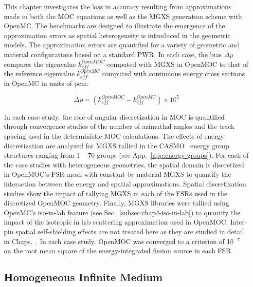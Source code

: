 This chapter investigates the loss in accuracy resulting from approximations made in both the \ac{MOC} equations as well as the \ac{MGXS} generation scheme with OpenMC. The benchmarks are designed to illustrate the emergence of the approximation errors as spatial heterogeneity is introduced in the geometric models. The approximation errors are quantified for a variety of geometric and material configurations based on a standard \ac{PWR}. In each case, the bias $\Delta\rho$ compares the eigenvalue $k_{eff}^{OpenMOC}$ computed with \ac{MGXS} in OpenMOC to that of the reference eigenvalue $k_{eff}^{OpenMC}$ computed with continuous energy cross sections in OpenMC in units of \ac{pcm}:

\begin{equation}
\label{eqn:chap5-delta-rho}
\Delta\rho = \left(k_{eff}^{OpenMOC} - k_{eff}^{OpenMC}\right) \times 10^{5}
\end{equation}

In each case study, the role of angular discretization in \ac{MOC} is quantified through convergence studies of the number of azimuthal angles and the track spacing used in the deterministic \ac{MOC} calculations. The effects of energy discretization are analyzed for \ac{MGXS} tallied in the CASMO~\cite{rhodes2006casmo} energy group structures ranging from 1 -- 70 groups (see App.~\ref{app:energy-groups}). For each of the case studies with heterogeneous geometries, the spatial domain is discretized in OpenMOC's \ac{FSR} mesh with constant-by-material \ac{MGXS} to quantify the interaction between the energy and spatial approximations. Spatial discretization studies show the impact of tallying \ac{MGXS} in each of the \ac{FSR}s used in the discretized OpenMOC geometry. Finally, \ac{MGXS} libraries were tallied using OpenMC's iso-in-lab feature (see Sec.~\ref{subsec:chap4-iso-in-lab}) to quantify the impact of the isotropic in lab scattering approximation used in OpenMOC. Inter-pin spatial self-shielding effects are not treated here as they are studied in detail in Chaps.~. In each case study, OpenMOC was converged to a criterion of 10$^{-7}$ on the root mean square of the energy-integrated fission source in each \ac{FSR}.

\subsection{Homogeneous Infinite Medium}
\label{subsec:chap5-inf-medium}

